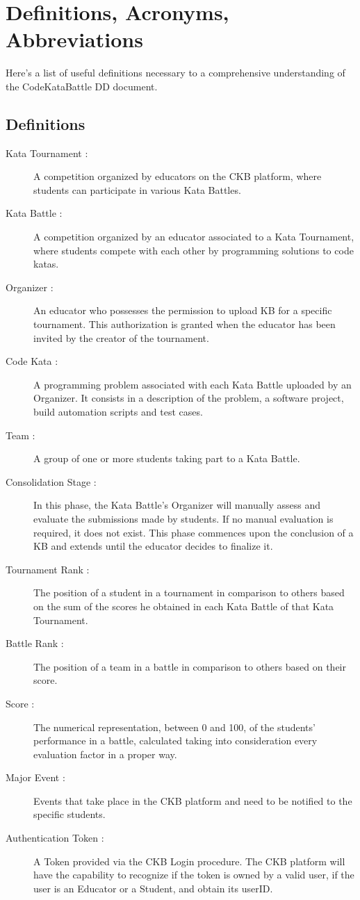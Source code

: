 \documentclass[11pt]{report}
\begin{document}
\section{Definitions, Acronyms, Abbreviations}

Here's a list of useful definitions necessary to a comprehensive understanding of the CodeKataBattle DD document.

\subsection{Definitions}\label{sec:definitions}

\begin{description}
    \item[Kata Tournament :] A competition organized by educators on the CKB platform, where students
        can participate in various Kata Battles.
    \item[Kata Battle :] A competition organized by an educator associated to a Kata Tournament, where students
        compete with each other by programming solutions to code katas.
    \item[Organizer :] An educator who possesses the permission to upload KB for a specific tournament.
    This authorization is granted when the educator has been invited by the creator of the tournament.
    \item[Code Kata :] A programming problem associated with each Kata Battle uploaded by an Organizer.
        It consists in a description of the problem, a software project, build automation scripts and test cases.
    \item[Team :] A group of one or more students taking part to a Kata Battle.
    \item[Consolidation Stage :] In this phase, the Kata Battle's Organizer will manually assess and evaluate the submissions made by students.
        If no manual evaluation is required, it does not exist.
        This phase commences upon the conclusion of a KB and extends until the educator decides to finalize it.
    \item[Tournament Rank :] The position of a student in a tournament in comparison to others based on the sum of the scores
    he obtained in each Kata Battle of that Kata Tournament.
    \item[Battle Rank :] The position of a team in a battle in comparison to others based on their score.
    \item[Score :] The numerical representation, between 0 and 100, of the students' performance in a battle,
        calculated taking into consideration every evaluation factor in a proper way.
    \item[Major Event :] Events that take place in the CKB platform and need to be notified to the specific students.
    \item[Authentication Token :] A Token provided via the CKB Login procedure.
        The CKB platform will have the capability to recognize if the token is owned by a valid user, if the user is an Educator or a Student, and obtain its userID\@.
\end{description}
\end{document}
